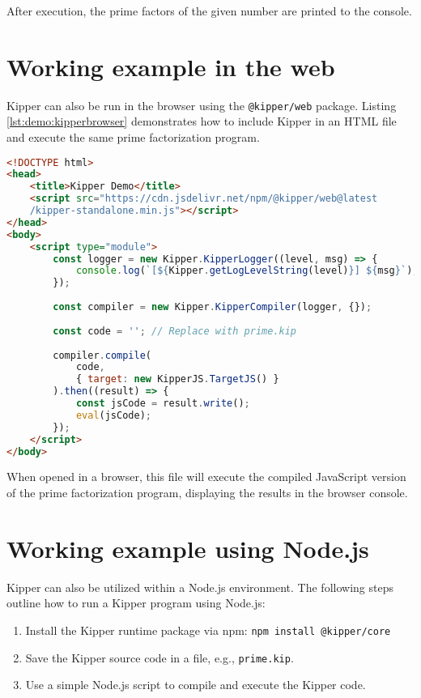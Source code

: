 After execution, the prime factors of the given number are printed to the console.

\section{Working example in the web}

Kipper can also be run in the browser using the \texttt{@kipper/web} package. Listing \ref{lst:demo:kipperbrowser} demonstrates how to include Kipper in an HTML file and execute the same prime factorization program.

\begin{lstlisting}[language=HTML,caption=Running Kipper in the browser, label=lst:demo:kipperbrowser]
<!DOCTYPE html>
<head>
	<title>Kipper Demo</title>
	<script src="https://cdn.jsdelivr.net/npm/@kipper/web@latest
	/kipper-standalone.min.js"></script>
</head>
<body>
	<script type="module">
		const logger = new Kipper.KipperLogger((level, msg) => {
			console.log(`[${Kipper.getLogLevelString(level)}] ${msg}`);
		});
		
		const compiler = new Kipper.KipperCompiler(logger, {});
		
		const code = ''; // Replace with prime.kip
		
		compiler.compile(
			code, 
			{ target: new KipperJS.TargetJS() }
		).then((result) => {
			const jsCode = result.write();
			eval(jsCode);
		});
	</script>
</body>
\end{lstlisting}

When opened in a browser, this file will execute the compiled JavaScript version of the prime factorization program, displaying the results in the browser console.

\section{Working example using Node.js}



Kipper can also be utilized within a Node.js environment. The following steps outline how to run a Kipper program using Node.js:

\begin{enumerate}
	\item Install the Kipper runtime package via npm: \lstinline|npm install @kipper/core|
	\item Save the Kipper source code in a file, e.g., \texttt{prime.kip}.
	\item Use a simple Node.js script to compile and execute the Kipper code.
\end{enumerate}

